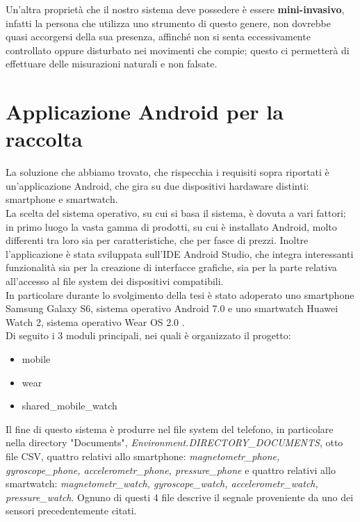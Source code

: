 \documentclass[a4paper, oneside]{book}
\begin{document}
\makebox[\linewidth]{}
Un'altra proprietà che il nostro sistema deve possedere è essere \textbf{mini-invasivo}, infatti la persona che utilizza uno strumento di questo genere, non dovrebbe quasi accorgersi della sua presenza, affinché non si senta eccessivamente controllato oppure disturbato nei movimenti che compie; questo ci permetterà di effettuare delle misurazioni naturali e non falsate.


	\section{Applicazione Android per la raccolta}
La soluzione che abbiamo trovato, che rispecchia i requisiti sopra riportati è un'applicazione Android, che gira su due dispositivi hardaware distinti: smartphone e smartwatch. \\ 
La scelta del sistema operativo, su cui si basa il sistema, è dovuta a vari fattori; in primo luogo la vasta gamma di prodotti, su cui è installato Android, molto differenti tra loro sia per caratteristiche, che per fasce di prezzi. Inoltre l'applicazione è stata sviluppata sull’IDE Android Studio, che integra interessanti funzionalità sia per la creazione di interfacce grafiche, sia per la parte relativa all’accesso al file system dei dispositivi compatibili. \\
In particolare durante lo svolgimento della tesi è stato adoperato uno smartphone Samsung Galaxy S6, sistema operativo Android 7.0 e uno smartwatch Huawei Watch 2, sistema operativo Wear OS 2.0 . \\
Di seguito i 3 moduli principali, nei quali è organizzato il progetto:
\begin{itemize}
\item mobile
\item wear
\item shared\_mobile\_watch \\
\end{itemize}
Il fine di questo sistema è produrre nel file system del telefono, in particolare nella directory "Documents", \textit{Environment.DIRECTORY\_DOCUMENTS}, otto file CSV, quattro relativi allo smartphone: \textit{magnetometr\_phone, gyroscope\_phone, accelerometr\_phone, pressure\_phone} e quattro relativi allo smartwatch: \textit{magnetometr\_watch, gyroscope\_watch, accelerometr\_watch, pressure\_watch}. Ognuno di questi 4 file descrive il segnale proveniente da uno dei sensori precedentemente citati. \\
\end{document}
